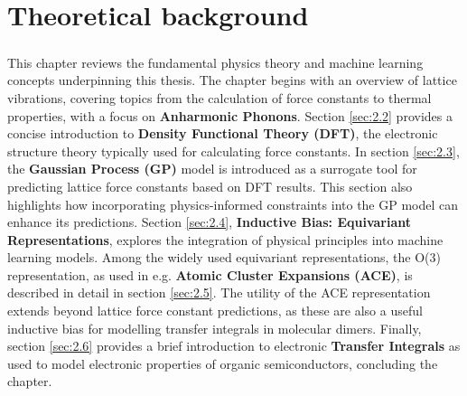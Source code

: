 \chapter{Theoretical background}
\label{ch:2}
\paragraph{}
This chapter reviews the fundamental physics theory and machine learning concepts underpinning this thesis.
The chapter begins with an overview of lattice vibrations, covering topics from the calculation of force constants to thermal properties, with a focus on \textbf{Anharmonic Phonons}.
Section \ref{sec:2.2} provides a concise introduction to \textbf{Density Functional Theory (DFT)}, the electronic structure theory typically used for calculating force constants.
In section \ref{sec:2.3}, the \textbf{Gaussian Process (GP)} model is introduced as a surrogate tool for predicting lattice force constants based on DFT results. This section also highlights how incorporating physics-informed constraints into the GP model can enhance its predictions.
Section \ref{sec:2.4}, \textbf{Inductive Bias: Equivariant Representations}, explores the integration of physical principles into machine learning models. Among the widely used equivariant representations, the O(3) representation, as used in e.g. \textbf{Atomic Cluster Expansions (ACE)}, is described in detail in section \ref{sec:2.5}. The utility of the ACE representation extends beyond lattice force constant predictions, as these are also a useful inductive bias for modelling transfer integrals in molecular dimers.
Finally, section \ref{sec:2.6} provides a brief introduction to electronic \textbf{Transfer Integrals} as used to model electronic properties of organic semiconductors, concluding the chapter.


